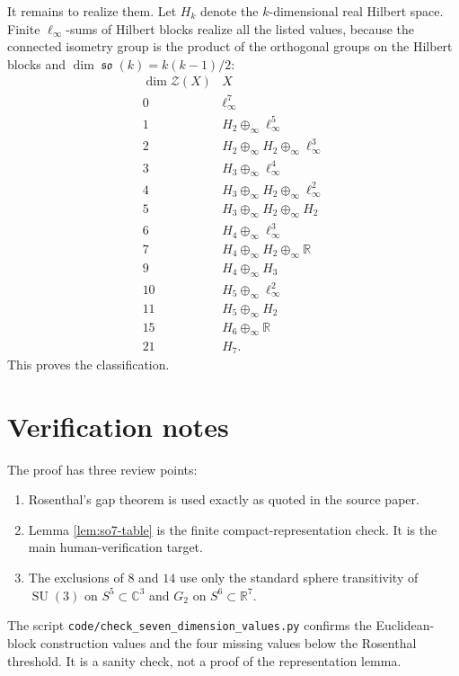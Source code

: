 \documentclass[11pt]{article}
\DeclareMathOperator{\SU}{SU}
\DeclareMathOperator{\so}{\mathfrak{so}}
\begin{document}
It remains to realize them. Let $H_k$ denote the $k$-dimensional real Hilbert
space. Finite $\ell_\infty$-sums of Hilbert blocks realize all the listed
values, because the connected isometry group is the product of the orthogonal
groups on the Hilbert blocks and
$\dim\so(k)=k(k-1)/2$:
\[
\begin{array}{c|l}
\dim\mathcal Z(X) & X\\ \hline
0 & \ell_\infty^7\\
1 & H_2\oplus_\infty \ell_\infty^5\\
2 & H_2\oplus_\infty H_2\oplus_\infty \ell_\infty^3\\
3 & H_3\oplus_\infty \ell_\infty^4\\
4 & H_3\oplus_\infty H_2\oplus_\infty \ell_\infty^2\\
5 & H_3\oplus_\infty H_2\oplus_\infty H_2\\
6 & H_4\oplus_\infty \ell_\infty^3\\
7 & H_4\oplus_\infty H_2\oplus_\infty \mathbb R\\
9 & H_4\oplus_\infty H_3\\
10 & H_5\oplus_\infty \ell_\infty^2\\
11 & H_5\oplus_\infty H_2\\
15 & H_6\oplus_\infty \mathbb R\\
21 & H_7.
\end{array}
\]
This proves the classification.

\section*{Verification notes}

The proof has three review points:
\begin{enumerate}
\item Rosenthal's gap theorem is used exactly as quoted in the source paper.
\item Lemma \ref{lem:so7-table} is the finite compact-representation check.
It is the main human-verification target.
\item The exclusions of $8$ and $14$ use only the standard sphere
transitivity of $\SU(3)$ on $S^5\subset\mathbb C^3$ and $G_2$ on
$S^6\subset\mathbb R^7$.
\end{enumerate}
The script \texttt{code/check\_seven\_dimension\_values.py} confirms the
Euclidean-block construction values and the four missing values below the
Rosenthal threshold. It is a sanity check, not a proof of the representation
lemma.
\end{document}
